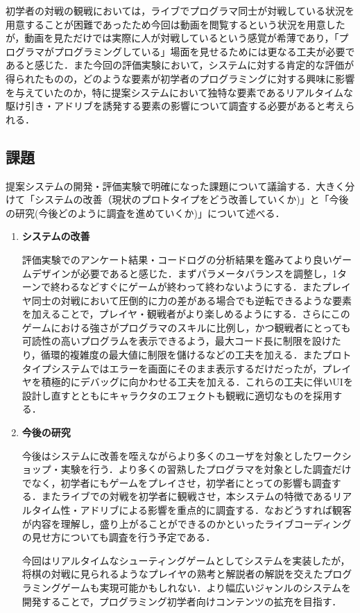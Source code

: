 初学者の対戦の観戦においては，ライブでプログラマ同士が対戦している状況を用意することが困難であったため今回は動画を閲覧するという状況を用意したが，動画を見ただけでは実際に人が対戦しているという感覚が希薄であり，「プログラマがプログラミングしている」場面を見せるためには更なる工夫が必要であると感じた．また今回の評価実験において，システムに対する肯定的な評価が得られたものの，どのような要素が初学者のプログラミングに対する興味に影響を与えていたのか，特に提案システムにおいて独特な要素であるリアルタイムな駆け引き・アドリブを誘発する要素の影響について調査する必要があると考えられる．

\subsection{課題}
提案システムの開発・評価実験で明確になった課題について議論する．大きく分けて「システムの改善（現状のプロトタイプをどう改善していくか)」と「今後の研究(今後どのように調査を進めていくか)」について述べる．

\begin{enumerate}
  \item {\bf システムの改善}

  評価実験でのアンケート結果・コードログの分析結果を鑑みてより良いゲームデザインが必要であると感じた．まずパラメータバランスを調整し，1ターンで終わるなどすぐにゲームが終わって終わないようにする．またプレイヤ同士の対戦において圧倒的に力の差がある場合でも逆転できるような要素を加えることで，プレイヤ・観戦者がより楽しめるようにする．さらにこのゲームにおける強さがプログラマのスキルに比例し，かつ観戦者にとっても可読性の高いプログラムを表示できるよう，最大コード長に制限を設けたり，循環的複雑度の最大値に制限を儲けるなどの工夫を加える．またプロトタイプシステムではエラーを画面にそのまま表示するだけだったが，プレイヤを積極的にデバッグに向かわせる工夫を加える．これらの工夫に伴いUIを設計し直すとともにキャラクタのエフェクトも観戦に適切なものを採用する．

  \item {\bf 今後の研究}

  今後はシステムに改善を咥えながらより多くのユーザを対象としたワークショップ・実験を行う．より多くの習熟したプログラマを対象とした調査だけでなく，初学者にもゲームをプレイさせ，初学者にとっての影響も調査する．またライブでの対戦を初学者に観戦させ，本システムの特徴であるリアルタイム性・アドリブによる影響を重点的に調査する．なおどうすれば観客が内容を理解し，盛り上がることができるのかといったライブコーディングの見せ方についても調査を行う予定である．

  今回はリアルタイムなシューティングゲームとしてシステムを実装したが，将棋の対戦に見られるようなプレイヤの熟考と解説者の解説を交えたプログラミングゲームも実現可能かもしれない．より幅広いジャンルのシステムを開発することで，プログラミング初学者向けコンテンツの拡充を目指す．
\end{enumerate}

